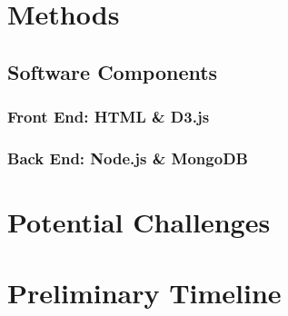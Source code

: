 \documentclass[12pt]{article}
\begin{document}
\section{Methods}
\subsection{Software Components}
\subsubsection{Front End: HTML \& D3.js}
\subsubsection{Back End: Node.js \& MongoDB}

\section{Potential Challenges}



\section{Preliminary Timeline}



\end{document}
